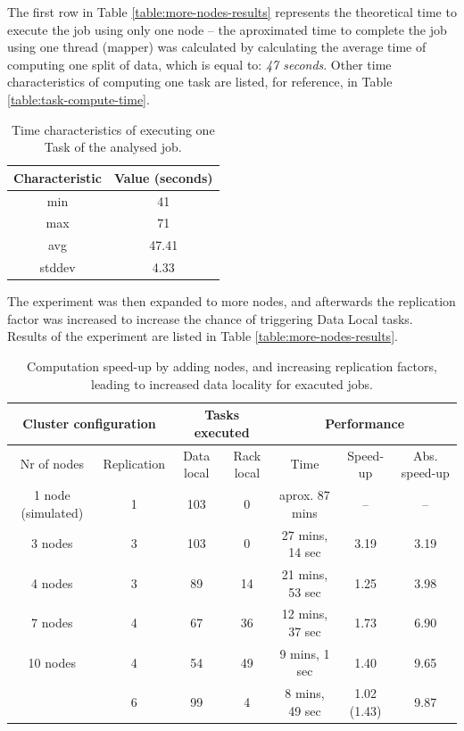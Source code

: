 The first row in Table \ref{table:more-nodes-results} represents the theoretical time to execute the job using only one node -- the aproximated time to complete the job using one thread (mapper) was calculated by calculating the average time of computing one split of data, which is equal to: \textit{47 seconds}. Other time characteristics of computing one task are listed, for reference, in Table \ref{table:task-compute-time}.

\begin{table}[hbt]
  \centering
  \begin{tabular}{|c|c|}
  \hline
    \textbf{Characteristic} & \textbf{Value (seconds)} \\ \hline
    min                     & 41     \\ \hline
    max                     & 71     \\ \hline
    avg                 	    & 47.41  \\ \hline
    stddev                  & 4.33   \\ \hline
  \end{tabular}
  \label{table:time-task}
  \caption{Time characteristics of executing one Task of the analysed job.}
\end{table}


The experiment was then expanded to more nodes, and afterwards the replication factor was increased to increase the chance of triggering Data Local tasks. Results of the experiment are listed in Table \ref{table:more-nodes-results}.

\begin{table}[hbt]
  \centering
  \begin{tabular}{|c c|c|c|c|c|c|}
  \hline
    \multicolumn{2}{|c|}{\textbf{Cluster configuration}} & \multicolumn{2}{|c|}{\textbf{Tasks executed}} & \multicolumn{3}{|c|}{\textbf{Performance}} \\ \hline
    Nr of nodes & Replication & Data local & Rack local   & Time              & Speed-up    & Abs. speed-up \\ \hline
    1 node (simulated)    & 1 & 103 & 0                   & aprox. 87 mins    & --          & --            \\ \hline
    3 nodes               & 3 & 103 & 0                   & 27 mins, 14 sec   & 3.19        & 3.19          \\ \hline
    4 nodes               & 3 & 89  & 14                  & 21 mins, 53 sec   & 1.25        & 3.98          \\ \hline
    7 nodes               & 4 & 67  & 36                  & 12 mins, 37 sec   & 1.73        & 6.90          \\ \hline
    10 nodes              & 4 & 54  & 49                  & 9 mins, 1 sec     & 1.40        & 9.65          \\       
                          & 6 & 99  & 4                   & 8 mins, 49 sec    & 1.02 (1.43) & 9.87          \\ \hline
  \end{tabular}
  \caption{Computation speed-up by adding nodes, and increasing replication factors, leading to increased data locality for exacuted jobs.}
  \label{tab:more-nodes-results}
\end{table}

